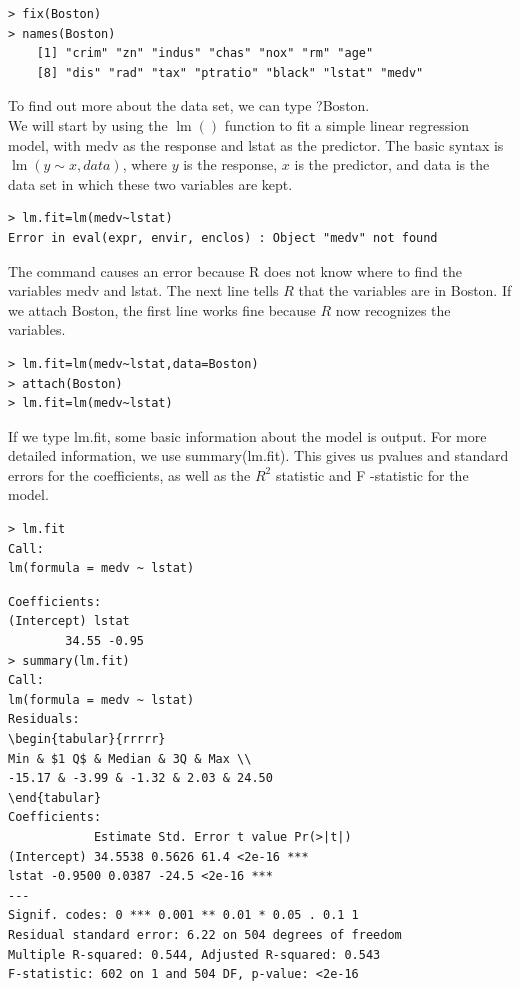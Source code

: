 \documentclass[10pt]{article}
\begin{document}
\begin{verbatim}
> fix(Boston)
> names(Boston)
    [1] "crim" "zn" "indus" "chas" "nox" "rm" "age"
    [8] "dis" "rad" "tax" "ptratio" "black" "lstat" "medv"
\end{verbatim}

To find out more about the data set, we can type ?Boston.\\
We will start by using the $\operatorname{lm}()$ function to fit a simple linear regression model, with medv as the response and lstat as the predictor. The basic syntax is $\operatorname{lm}(y \sim x, d a t a)$, where $y$ is the response, $x$ is the predictor, and data is the data set in which these two variables are kept.

\begin{verbatim}
> lm.fit=lm(medv~lstat)
Error in eval(expr, envir, enclos) : Object "medv" not found
\end{verbatim}

The command causes an error because R does not know where to find the variables medv and lstat. The next line tells $R$ that the variables are in Boston. If we attach Boston, the first line works fine because $R$ now recognizes the variables.

\begin{verbatim}
> lm.fit=lm(medv~lstat,data=Boston)
> attach(Boston)
> lm.fit=lm(medv~lstat)
\end{verbatim}

If we type lm.fit, some basic information about the model is output. For more detailed information, we use summary(lm.fit). This gives us pvalues and standard errors for the coefficients, as well as the $R^{2}$ statistic and F -statistic for the model.

\begin{verbatim}
> lm.fit
Call:
lm(formula = medv ~ lstat)
\end{verbatim}

\begin{verbatim}
Coefficients:
(Intercept) lstat
        34.55 -0.95
> summary(lm.fit)
Call:
lm(formula = medv ~ lstat)
Residuals:
\begin{tabular}{rrrrr} 
Min & $1 Q$ & Median & 3Q & Max \\
-15.17 & -3.99 & -1.32 & 2.03 & 24.50
\end{tabular}
Coefficients:
            Estimate Std. Error t value Pr(>|t|)
(Intercept) 34.5538 0.5626 61.4 <2e-16 ***
lstat -0.9500 0.0387 -24.5 <2e-16 ***
---
Signif. codes: 0 *** 0.001 ** 0.01 * 0.05 . 0.1 1
Residual standard error: 6.22 on 504 degrees of freedom
Multiple R-squared: 0.544, Adjusted R-squared: 0.543
F-statistic: 602 on 1 and 504 DF, p-value: <2e-16
\end{verbatim}
\end{document}
